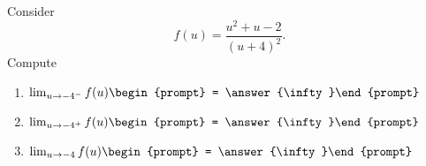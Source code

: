 \documentclass{ximera}
\author{Bart Snapp}
\begin{document}
\begin{exercise}
Consider 
\[
f(u) = \frac{u^2+u-2}{(u+4)^2}.
\]
Compute
\begin{enumerate}
\item $\lim_{u\to -4^- } f(u) \begin{prompt} = \answer{\infty}\end{prompt}$
\item $\lim_{u\to -4^+ } f(u) \begin{prompt} = \answer{\infty}\end{prompt}$
\item $\lim_{u\to -4 } f(u) \begin{prompt} = \answer{\infty}\end{prompt}$
\end{enumerate}
\end{exercise}
\end{document}
